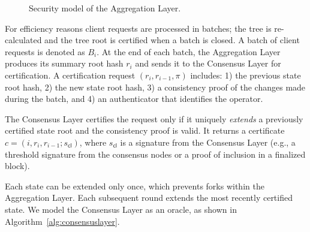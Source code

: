 \documentclass[twocolumn]{article}
\begin{document}
\begin{figure}[!htbp]
    \centering
{}
    \caption{Security model of the Aggregation Layer.}\label{fig:model}
\end{figure}

For efficiency reasons client requests are processed in batches; the tree is re-calculated and the tree root is certified when a batch is closed. A batch of client requests is denoted as $B_i$. At the end of each batch, the Aggregation Layer produces its summary root hash $r_i$ and sends it to the Consensus Layer for certification. A certification request $(r_i, r_{i-1}, \pi)$ includes: 1) the previous state root hash, 2) the new state root hash, 3) a consistency proof of the changes made during the batch, and 4) an authenticator that identifies the operator.

The Consensus Layer certifies the request only if it uniquely \textit{extends} a previously certified state root and the consistency proof is valid. It returns a certificate $c = (i, r_i, r_{i-1}; s_{\textsf{cl}})$, where $s_{\textsf{cl}}$ is a signature from the Consensus Layer (e.g., a threshold signature from the consensus nodes or a proof of inclusion in a finalized block).

Each state can be extended only once, which prevents forks within the Aggregation Layer. Each subsequent round extends the most recently certified state.
We model the Consensus Layer as an oracle, as shown in Algorithm~\ref{alg:consensuslayer}.
\end{document}
